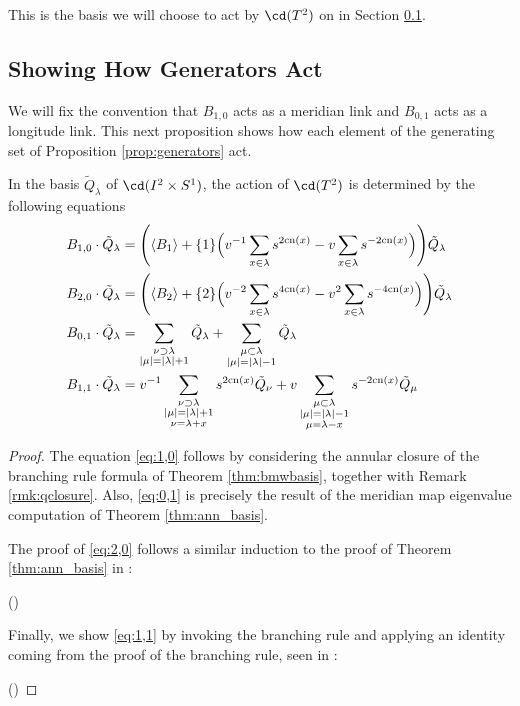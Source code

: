 This is the basis we will choose to act by $\cd(T^2)$ on in Section \ref{sec:action}. 


\subsection{Showing How Generators Act} \label{sec:action}

We will fix the convention that $B_{1,0}$ acts as a meridian link and $B_{0,1}$ acts as a longitude link. This next proposition shows how each element of the generating set of Proposition \ref{prop:generators} act.

\begin{proposition} \label{prop:generatoractions}
In the basis $\tilde{Q}_\lambda$ of $\cd(I^2 \times S^1)$, the action of $\cd(T^2)$ is determined by the following equations
\begin{align}
    B_{1,0} \cdot \tilde{Q}_\lambda &= \Bigg(\langle B_1 \rangle + \{1\} \Big( v^{-1}\sum_{x\in\lambda} s^{2\mathrm{cn}(x)} - v \sum_{x\in\lambda} s^{-2\mathrm{cn}(x)} \Big) \Bigg) \tilde{Q}_\lambda \label{eq:1,0}\\
    B_{2,0} \cdot \tilde{Q}_\lambda &= \Bigg(\langle B_2 \rangle + \{2\} \Big( v^{-2}\sum_{x\in\lambda} s^{4\mathrm{cn}(x)} - v^2 \sum_{x\in\lambda} s^{-4\mathrm{cn}(x)} \Big) \Bigg) \tilde{Q}_\lambda \label{eq:2,0}\\
    B_{0,1} \cdot \tilde{Q}_\lambda &= \sum_{\substack{\nu \supset \lambda \\ |\mu| = |\lambda| + 1}} \tilde{Q}_\lambda + \sum_{\substack{\mu \subset \lambda \\ |\mu| = |\lambda| - 1}} \tilde{Q}_\lambda \label{eq:0,1}\\
    B_{1,1} \cdot \tilde{Q}_\lambda &= v^{-1} \sum_{\substack{\nu \supset \lambda \\ |\mu| = |\lambda| + 1 \\ \nu = \lambda + x}} s^{2\mathrm{cn}(x)} \tilde{Q}_\nu + v \sum_{\substack{\mu \subset \lambda \\ |\mu| = |\lambda| - 1 \\ \mu = \lambda - x}} s^{-2\mathrm{cn}(x)} \tilde{Q}_\mu \label{eq:1,1}
\end{align}
\end{proposition}
\begin{proof}
The equation \eqref{eq:1,0} follows by considering the annular closure of the branching rule formula of Theorem \ref{thm:bmwbasis}, together with Remark \ref{rmk:qclosure}. 
Also, \eqref{eq:0,1} is precisely the result of the meridian map eigenvalue computation of Theorem \ref{thm:ann_basis}. 

The proof of \eqref{eq:2,0} follows a similar induction to the proof of Theorem \ref{thm:ann_basis} in \cite{ZL01}:

()

Finally, we show \eqref{eq:1,1} by invoking the branching rule and applying an identity coming from the proof of the branching rule, seen in \cite{BB01}:

()
\end{proof}










